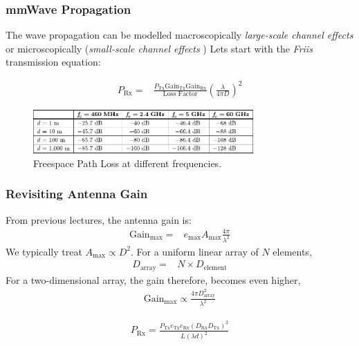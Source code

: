 \documentclass[10pt]{beamer}
\begin{document}
\begin{frame}
    \frametitle{mmWave Propagation}

    \begin{outline}
        \1 The wave propagation can be modelled macroscopically \textit{large-scale channel effects} or microscopically (\textit{small-scale channel effects}
        )
        \1 Lets start with the \textit{Friis} transmission equation:
    \end{outline}

    \begin{align*}
        P_{\text{Rx}} {}= & \frac{P_{\text{Tx}} \mathrm{Gain}_{\text{Tx}}  \mathrm{Gain}_{\text{Rx}}}{\text{Loss Factor}} \left(\frac{\lambda}{4 \pi D}\right)^2
    \end{align*}

    \begin{figure}[h!]
        \centering
        \includegraphics[width=0.75\textwidth]{table.pdf}
        \caption{Freespace Path Loss at different frequencies.}
    \end{figure}

\end{frame}



\begin{frame}
    \frametitle{Revisiting Antenna Gain}

    From previous lectures, the antenna gain is:
    \begin{align*}
        \mathrm{Gain}_{\max} {}= & e_{\max} A_{\max} \frac{4 \pi}{\lambda^{2}}
    \end{align*}
    We typically treat $A_{\max} \propto D^2$.    For a uniform linear array of $N$ elements,
    \begin{align*}
        D_{\text{array}} {}= & N \times D_{\text{element}}
    \end{align*}
    For a two-dimensional array, the gain therefore, becomes even higher,
    \begin{align*}
        \mathrm{Gain}_{\max} \propto \frac{4 \pi D_{\text{array}}^{2}}{\lambda^{2}}
    \end{align*}
    \begin{tcolorbox}[colback=blue!5]
        \begin{align*}
            P_{\text{Rx}}=\frac{P_{\text{Tx}} e_{\text{Tx}} e_{\text{Rx}}\left(D_{\text{Rx}} D_{\text{Tx}}\right)^{2}}{L(\lambda d)^{2}}
        \end{align*}
    \end{tcolorbox}
\end{frame}
\end{document}
